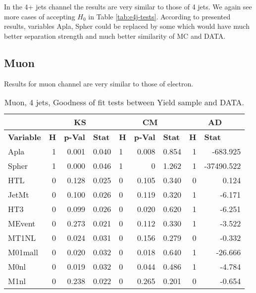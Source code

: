 In the 4+ jets channel the results are very similar to those of 4 jets. We again see more cases of accepting $H_0$ in Table \ref{tab:e4j-tests}. According to presented results, variables \textsf{Apla, Spher} could be replaced by some which would have much better separation strength and much better similarity of MC and DATA. 

\subsection{Muon}

Results for muon channel are very similar to those of electron.

\begin{table}[htbp] \footnotesize
\caption{Muon, 4 jets, Goodness of fit tests between Yield sample and DATA.}
\begin{center}
\begin{tabular}{|l|r|r|r|l|r|r|r|r|}
\hline
 & \multicolumn{ 3}{c|}{\textbf{KS}} & \multicolumn{ 3}{c|}{\textbf{CM}} & \multicolumn{ 2}{c|}{\textbf{AD}} \\ \hline
\textbf{Variable} & \multicolumn{1}{l|}{\textbf{H}} & \multicolumn{1}{l|}{\textbf{p-Val}} & \multicolumn{1}{l|}{\textbf{Stat}} & \multicolumn{1}{l|}{\textbf{H}} & \multicolumn{1}{l|}{\textbf{p-Val}} & \multicolumn{1}{l|}{\textbf{Stat}} & \multicolumn{1}{l|}{\textbf{H}} & \multicolumn{1}{l|}{\textbf{Stat}} \\ \hline
\textsf{Apla} & 1 & 0.001 & 0.040 & 1 & 0.008 & 0.854 & 1 & -683.925 \\ \hline
\textsf{Spher} & 1 & 0.000 & 0.046 & 1 & 0 & 1.262 & 1 & -37490.522 \\ \hline
\textsf{HTL} & 0 & 0.128 & 0.025 & 0 & 0.105 & 0.340 & 0 & 0.124 \\ \hline
\textsf{JetMt} & 0 & 0.100 & 0.026 & 0 & 0.119 & 0.320 & 1 & -6.171 \\ \hline
\textsf{HT3} & 0 & 0.099 & 0.026 & 0 & 0.020 & 0.620 & 1 & -6.251 \\ \hline
\textsf{MEvent} & 0 & 0.273 & 0.021 & 0 & 0.112 & 0.330 & 1 & -3.522 \\ \hline
\textsf{MT1NL} & 0 & 0.024 & 0.031 & 0 & 0.156 & 0.279 & 0 & -0.332 \\ \hline
\textsf{M01mall} & 0 & 0.020 & 0.032 & 0 & 0.018 & 0.640 & 1 & -26.666 \\ \hline
\textsf{M0nl} & 0 & 0.019 & 0.032 & 0 & 0.044 & 0.486 & 1 & -4.784 \\ \hline
\textsf{M1nl} & 0 & 0.238 & 0.022 & 0 & 0.265 & 0.201 & 0 & -0.654 \\ \hline

\end{tabular}
\end{center}
\end{table}

